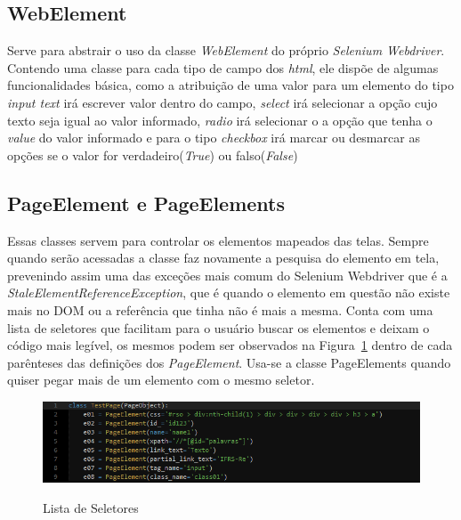         \subsection{WebElement}
            Serve para abstrair o uso da classe \textit{WebElement} do próprio \textit{Selenium Webdriver}. Contendo uma classe para cada tipo de campo dos \textit{html},
            ele dispõe de algumas funcionalidades básica, como a atribuição de uma valor para um elemento do tipo \textit{input text} irá escrever
            valor dentro do campo, \textit{select} irá selecionar a opção cujo texto seja igual ao valor informado, \textit{radio} irá selecionar o
            a opção que tenha o \textit{value} do valor informado e para o tipo \textit{checkbox} irá marcar ou desmarcar as opções se o valor for
            verdadeiro(\textit{True}) ou falso(\textit{False})

        \subsection{PageElement e PageElements}
        \label{PageElement}
            Essas classes servem para controlar os elementos mapeados das telas. Sempre quando serão acessadas a classe faz novamente a pesquisa
            do elemento em tela, prevenindo assim uma das exceções mais comum do Selenium Webdriver que é a \textit{StaleElementReferenceException},
            que é quando o elemento em questão não existe mais no DOM ou a referência que tinha não é mais a mesma. Conta com uma lista de seletores
            que facilitam para o usuário buscar os elementos e deixam o código mais legível, os mesmos podem ser observados na Figura~\ref{fig:selectors}
            dentro de cada parênteses das definições dos \textit{PageElement}.
            Usa-se a classe PageElements quando quiser pegar mais de um elemento com o mesmo seletor.


            \begin{figure}[H]
                \vspace*{0,3cm}
                \centering
                \caption{Lista de Seletores}
                \includegraphics[width=1\textwidth]{./04-figuras/selectors}
                \label{fig:selectors}
            \end{figure}


